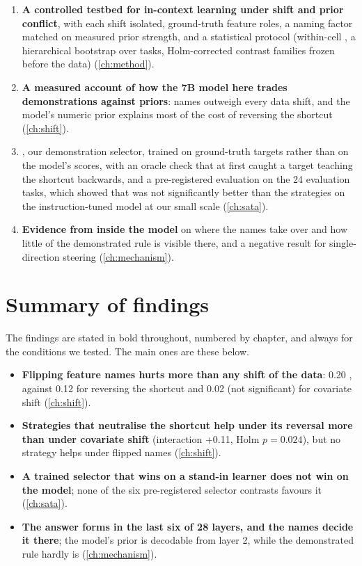 \begin{enumerate}[leftmargin=2em]
  \item \textbf{A controlled testbed for in-context learning under shift and prior conflict}, with each shift isolated, ground-truth feature roles, a naming factor matched on measured prior strength, and a statistical protocol (within-cell \AUROC, a hierarchical bootstrap over tasks, Holm-corrected contrast families frozen before the data) (\autoref{ch:method}).
  \item \textbf{A measured account of how the 7B model here trades demonstrations against priors}: names outweigh every data shift, and the model's numeric prior explains most of the cost of reversing the shortcut (\autoref{ch:shift}).
  
  \item \sata, our demonstration selector, trained on ground-truth targets rather than on the model's scores, with an oracle check that at first caught a target teaching the shortcut backwards, and a pre-registered evaluation on the 24 evaluation tasks, which showed that \sata was not significantly better than the strategies on the instruction-tuned model at our small scale (\autoref{ch:sata}).

  \item \textbf{Evidence from inside the model} on where the names take over and how little of the demonstrated rule is visible there, and a negative result for single-direction steering (\autoref{ch:mechanism}).
\end{enumerate}

\section{Summary of findings}

The findings are stated in bold throughout, numbered by chapter, and always for the conditions we tested.
The main ones are these below.

\begin{itemize}[leftmargin=1.5em]
  \item \textbf{Flipping feature names hurts more than any shift of the data}: 0.20 \AUROC, against 0.12 for reversing the shortcut and 0.02 (not significant) for covariate shift (\autoref{ch:shift}).
  \item \textbf{Strategies that neutralise the shortcut help under its reversal more than under covariate shift} (interaction +0.11, Holm $p = 0.024$), but no strategy helps under flipped names (\autoref{ch:shift}).
  \item \textbf{A trained selector that wins on a stand-in learner does not win on the model}; none of the six pre-registered selector contrasts favours it (\autoref{ch:sata}).
  \item \textbf{The answer forms in the last six of 28 layers, and the names decide it there}; the model's prior is decodable from layer 2, while the demonstrated rule hardly is (\autoref{ch:mechanism}).
\end{itemize}